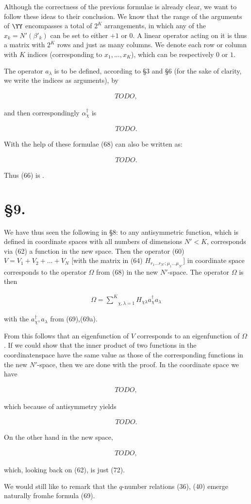 \documentclass{article}
\newcommand{\nequ}[2]{
\begin{align*}
#1
\tag{#2}
\end{align*}
}
\newcommand{\sumXY}[2]{\underset{#1}{\overset{#2}{\sum}}}
\begin{document}
Although the correctness of the previous formulae is already clear, we want to follow these ideas to their conclusion. We know that the range of the arguments of $\YY$ encompasses a total of $2^K$ arrangements, in which any of the $x_k=N'(\beta'_k)$ can be set to either $+1$ or $0$. A linear operator acting on it is thus a matrix with $2^K$ rows and just as many columns. We denote each row or column with $K$ indices (corresponding to $x_1,...,x_K$), which can be respectively $0$ or $1$.

The operator $a_\lambda$ is to be defined, according to §3 and §6 (for the sake of clarity, we write the indices as arguments), by
\nequ{TODO,}{69}
and then correspondingly $\alpha^\dagger_\chi$ is
\nequ{TODO.}{69a}

With the help of these formulae (68) can also be written as:
\nequ{TODO.}{70}
 Thus (66) is .

\section*{§9.}
We have thus seen the following in §8: to any antisymmetric function, which is defined in coordinate spaces with all numbers of dimensions $N'<K$, corresponds via (62) a function in the new space. Then the operator (60) $V=V_1+V_2+...+V_N$ [with the matrix in (64) $H_{r_1...r_{N'};\mu_1...\mu_{N'}}$] in coordinate space corresponds to the operator $\Omega$ from (68) in the new $N'$-space. The operator $\Omega$ is then
\nequ{
\Omega = \sumXY{\chi,\lambda=1}{K}H_{\chi\lambda}a^\dagger_\chi a_\lambda
}{66a}
with the $a^\dagger_\chi,a_\lambda$ from (69),(69a).

From this follows that an eigenfunction of $V$ corresponds to an eigenfunction of $\Omega$. If we could show that the inner product of two functions in the coordinatenspace have the same value as those of the corresponding functions in the new $N'$-space, then we are done with the proof. In the coordinate space we have
\nequ{TODO,}{71}
which because of antisymmetry yields
\nequ{TODO.}{72}
On the other hand in the new space,
\nequ{TODO,}{73}
which, looking back on (62), is just (72).

We would still like to remark that the $q$-number relations (36), (40) emerge naturally fromhe formula (69).
\end{document}
